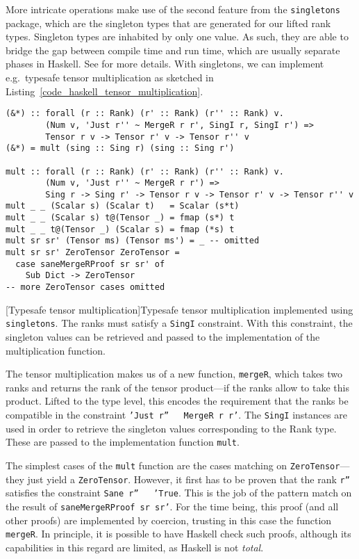More intricate operations make use of the second feature from the \texttt{singletons} package, which are the singleton types that are generated for our lifted rank types. Singleton types are inhabited by only one value. As such, they are able to bridge the gap between compile time and run time, which are usually separate phases in Haskell. See \cite{Eisenberg_2012} for more details. With singletons, we can implement e.g.\ typesafe tensor multiplication as sketched in Listing~\ref{code_haskell_tensor_multiplication}.
\begin{code}
  \begin{verbatim}
(&*) :: forall (r :: Rank) (r' :: Rank) (r'' :: Rank) v.
        (Num v, 'Just r'' ~ MergeR r r', SingI r, SingI r') =>
        Tensor r v -> Tensor r' v -> Tensor r'' v
(&*) = mult (sing :: Sing r) (sing :: Sing r')

mult :: forall (r :: Rank) (r' :: Rank) (r'' :: Rank) v.
        (Num v, 'Just r'' ~ MergeR r r') =>
        Sing r -> Sing r' -> Tensor r v -> Tensor r' v -> Tensor r'' v
mult _ _ (Scalar s) (Scalar t)   = Scalar (s*t)
mult _ _ (Scalar s) t@(Tensor _) = fmap (s*) t
mult _ _ t@(Tensor _) (Scalar s) = fmap (*s) t
mult sr sr' (Tensor ms) (Tensor ms') = _ -- omitted
mult sr sr' ZeroTensor ZeroTensor =
  case saneMergeRProof sr sr' of
    Sub Dict -> ZeroTensor
-- more ZeroTensor cases omitted
  \end{verbatim}
  [Typesafe tensor multiplication]{Typesafe tensor multiplication implemented using \texttt{singletons}. The ranks must satisfy a \texttt{SingI} constraint. With this constraint, the singleton values can be retrieved and passed to the implementation of the multiplication function.}
  \label{code_haskell_tensor_multiplication}
\end{code}
The tensor multiplication makes us of a new function, \texttt{mergeR}, which takes two ranks and returns the rank of the tensor product---if the ranks allow to take this product. Lifted to the type level, this encodes the requirement that the ranks be compatible in the constraint \texttt{'Just r'' ~ MergeR r r'}. The \texttt{SingI} instances are used in order to retrieve the singleton values corresponding to the Rank type. These are passed to the implementation function \texttt{mult}.

The simplest cases of the \texttt{mult} function are the cases matching on \texttt{ZeroTensor}---they just yield a \texttt{ZeroTensor}. However, it first has to be proven that the rank \texttt{r''} satisfies the constraint \texttt{Sane r'' ~ 'True}. This is the job of the pattern match on the result of \texttt{saneMergeRProof sr sr'}. For the time being, this proof (and all other proofs) are implemented by coercion, trusting in this case the function \texttt{mergeR}. In principle, it is possible to have Haskell check such proofs, although its capabilities in this regard are limited, as Haskell is not \emph{total}.

